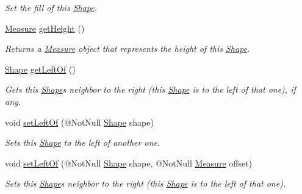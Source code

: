 \begin{DoxyCompactItemize}
\begin{DoxyCompactList}\small\item\em Set the fill of this \hyperlink{classcom_1_1aarrelaakso_1_1drawl_1_1_shape}{Shape}. \end{DoxyCompactList}\item 
\hyperlink{classcom_1_1aarrelaakso_1_1drawl_1_1_measure}{Measure} \hyperlink{classcom_1_1aarrelaakso_1_1drawl_1_1_shape_ac9f74d31c332aab76b329edc22080e67}{get\+Height} ()
\begin{DoxyCompactList}\small\item\em Returns a \hyperlink{classcom_1_1aarrelaakso_1_1drawl_1_1_measure}{Measure} object that represents the height of this \hyperlink{classcom_1_1aarrelaakso_1_1drawl_1_1_shape}{Shape}. \end{DoxyCompactList}\item 
\hyperlink{classcom_1_1aarrelaakso_1_1drawl_1_1_shape}{Shape} \hyperlink{classcom_1_1aarrelaakso_1_1drawl_1_1_shape_a2b19d5964ac46d545a7bae3133df6532}{get\+Left\+Of} ()
\begin{DoxyCompactList}\small\item\em Gets this \hyperlink{classcom_1_1aarrelaakso_1_1drawl_1_1_shape}{Shape}\textquotesingle{}s neighbor to the right (this \hyperlink{classcom_1_1aarrelaakso_1_1drawl_1_1_shape}{Shape} is to the left of that one), if any. \end{DoxyCompactList}\item 
void \hyperlink{classcom_1_1aarrelaakso_1_1drawl_1_1_shape_aa9979f6455fea0f9a066365cea3fc9db}{set\+Left\+Of} (@Not\+Null \hyperlink{classcom_1_1aarrelaakso_1_1drawl_1_1_shape}{Shape} shape)
\begin{DoxyCompactList}\small\item\em Sets this \hyperlink{classcom_1_1aarrelaakso_1_1drawl_1_1_shape}{Shape} to the left of another one. \end{DoxyCompactList}\item 
void \hyperlink{classcom_1_1aarrelaakso_1_1drawl_1_1_shape_a185e0377ed1ba3ff4c8c630803f3bfc8}{set\+Left\+Of} (@Not\+Null \hyperlink{classcom_1_1aarrelaakso_1_1drawl_1_1_shape}{Shape} shape, @Not\+Null \hyperlink{classcom_1_1aarrelaakso_1_1drawl_1_1_measure}{Measure} offset)
\begin{DoxyCompactList}\small\item\em Sets this \hyperlink{classcom_1_1aarrelaakso_1_1drawl_1_1_shape}{Shape}\textquotesingle{}s neighbor to the right (this \hyperlink{classcom_1_1aarrelaakso_1_1drawl_1_1_shape}{Shape} is to the left of that one). \end{DoxyCompactList}\item 

\end{DoxyCompactItemize}
